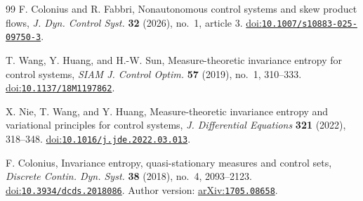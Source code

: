 \documentclass[11pt,a4paper]{article}
\theoremstyle{definition}
\theoremstyle{remark}
\begin{document}
\begin{thebibliography}{99}
F. Colonius and R. Fabbri,
Nonautonomous control systems and skew product flows,
\emph{J. Dyn. Control Syst.} \textbf{32} (2026), no.~1, article 3.
\href{https://doi.org/10.1007/s10883-025-09750-3}{doi:\nolinkurl{10.1007/s10883-025-09750-3}}.

T. Wang, Y. Huang, and H.-W. Sun,
Measure-theoretic invariance entropy for control systems,
\emph{SIAM J. Control Optim.} \textbf{57} (2019), no.~1, 310--333.
\href{https://doi.org/10.1137/18M1197862}{doi:\nolinkurl{10.1137/18M1197862}}.

X. Nie, T. Wang, and Y. Huang,
Measure-theoretic invariance entropy and variational principles for control systems,
\emph{J. Differential Equations} \textbf{321} (2022), 318--348.
\href{https://doi.org/10.1016/j.jde.2022.03.013}{doi:\nolinkurl{10.1016/j.jde.2022.03.013}}.

F. Colonius, Invariance entropy, quasi-stationary measures and control sets,
\emph{Discrete Contin. Dyn. Syst.} \textbf{38} (2018), no.~4, 2093--2123.
\href{https://doi.org/10.3934/dcds.2018086}{doi:\nolinkurl{10.3934/dcds.2018086}}. Author version: \href{https://arxiv.org/abs/1705.08658}{arXiv:\nolinkurl{1705.08658}}.
\end{thebibliography}
\end{document}
